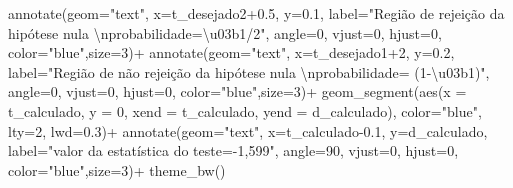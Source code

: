 \documentclass[
]{book}
\newenvironment{Shaded}{\begin{snugshade}}{\end{snugshade}}
\newcommand{\AttributeTok}[1]{\textcolor[rgb]{0.77,0.63,0.00}{#1}}
\newcommand{\DecValTok}[1]{\textcolor[rgb]{0.00,0.00,0.81}{#1}}
\newcommand{\FloatTok}[1]{\textcolor[rgb]{0.00,0.00,0.81}{#1}}
\newcommand{\FunctionTok}[1]{\textcolor[rgb]{0.00,0.00,0.00}{#1}}
\newcommand{\NormalTok}[1]{#1}
\newcommand{\SpecialCharTok}[1]{\textcolor[rgb]{0.00,0.00,0.00}{#1}}
\newcommand{\StringTok}[1]{\textcolor[rgb]{0.31,0.60,0.02}{#1}}
\begin{document}
\begin{Shaded}
\begin{Highlighting}[]
 \FunctionTok{annotate}\NormalTok{(}\AttributeTok{geom=}\StringTok{"text"}\NormalTok{, }\AttributeTok{x=}\NormalTok{t\_desejado2}\FloatTok{+0.5}\NormalTok{, }\AttributeTok{y=}\FloatTok{0.1}\NormalTok{, }\AttributeTok{label=}\StringTok{"Região de rejeição da hipótese nula }\SpecialCharTok{\textbackslash{}n}\StringTok{probabilidade=\textbackslash{}u03b1/2"}\NormalTok{, }\AttributeTok{angle=}\DecValTok{0}\NormalTok{, }\AttributeTok{vjust=}\DecValTok{0}\NormalTok{, }\AttributeTok{hjust=}\DecValTok{0}\NormalTok{, }\AttributeTok{color=}\StringTok{"blue"}\NormalTok{,}\AttributeTok{size=}\DecValTok{3}\NormalTok{)}\SpecialCharTok{+}
 \FunctionTok{annotate}\NormalTok{(}\AttributeTok{geom=}\StringTok{"text"}\NormalTok{, }\AttributeTok{x=}\NormalTok{t\_desejado1}\SpecialCharTok{+}\DecValTok{2}\NormalTok{, }\AttributeTok{y=}\FloatTok{0.2}\NormalTok{, }\AttributeTok{label=}\StringTok{"Região de não rejeição da hipótese nula }\SpecialCharTok{\textbackslash{}n}\StringTok{probabilidade= (1{-}\textbackslash{}u03b1)"}\NormalTok{, }\AttributeTok{angle=}\DecValTok{0}\NormalTok{, }\AttributeTok{vjust=}\DecValTok{0}\NormalTok{, }\AttributeTok{hjust=}\DecValTok{0}\NormalTok{, }\AttributeTok{color=}\StringTok{"blue"}\NormalTok{,}\AttributeTok{size=}\DecValTok{3}\NormalTok{)}\SpecialCharTok{+}
 \FunctionTok{geom\_segment}\NormalTok{(}\FunctionTok{aes}\NormalTok{(}\AttributeTok{x =}\NormalTok{ t\_calculado, }\AttributeTok{y =} \DecValTok{0}\NormalTok{, }\AttributeTok{xend =}\NormalTok{ t\_calculado, }\AttributeTok{yend =}\NormalTok{ d\_calculado), }\AttributeTok{color=}\StringTok{"blue"}\NormalTok{, }\AttributeTok{lty=}\DecValTok{2}\NormalTok{, }\AttributeTok{lwd=}\FloatTok{0.3}\NormalTok{)}\SpecialCharTok{+}
 \FunctionTok{annotate}\NormalTok{(}\AttributeTok{geom=}\StringTok{"text"}\NormalTok{, }\AttributeTok{x=}\NormalTok{t\_calculado}\FloatTok{{-}0.1}\NormalTok{, }\AttributeTok{y=}\NormalTok{d\_calculado, }\AttributeTok{label=}\StringTok{"valor da estatística do teste={-}1,599"}\NormalTok{, }\AttributeTok{angle=}\DecValTok{90}\NormalTok{, }\AttributeTok{vjust=}\DecValTok{0}\NormalTok{, }\AttributeTok{hjust=}\DecValTok{0}\NormalTok{, }\AttributeTok{color=}\StringTok{"blue"}\NormalTok{,}\AttributeTok{size=}\DecValTok{3}\NormalTok{)}\SpecialCharTok{+}
  \FunctionTok{theme\_bw}\NormalTok{()}
\end{Highlighting}
\end{Shaded}
\end{document}

